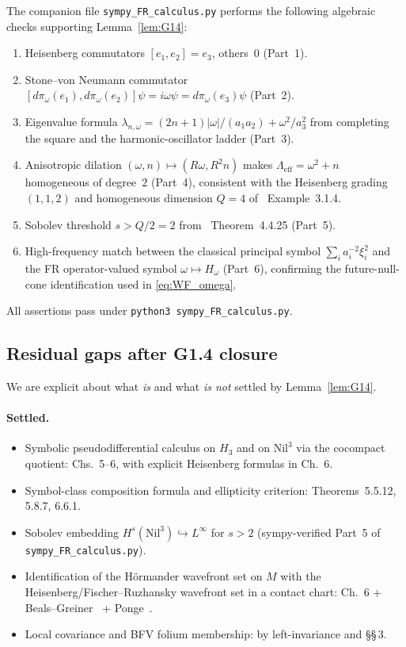 \documentclass[11pt, a4paper]{article}
\newcommand{\Hgroup}{H_3}
\newcommand{\Nil}{\mathrm{Nil}^3}
\newcommand{\dpiom}{d\pi_\omega}
\newcommand{\lam}{\lambda}
\newcommand{\om}{\omega}
\newcommand{\Lam}{\Lambda}
\begin{document}
The companion file \texttt{sympy\_FR\_calculus.py} performs the following
algebraic checks supporting Lemma~\ref{lem:G14}:
\begin{enumerate}[label=(\arabic*)]
  \item Heisenberg commutators $[e_1,e_2]=e_3$, others~$0$ (Part~1).
  \item Stone--von Neumann commutator
        $[\dpiom(e_1),\dpiom(e_2)]\psi = i\om\psi = \dpiom(e_3)\psi$ (Part~2).
  \item Eigenvalue formula $\lam_{n,\om}=(2n+1)|\om|/(a_1 a_2)+\om^2/a_3^2$
        from completing the square and the harmonic-oscillator ladder (Part~3).
  \item Anisotropic dilation $(\om,n)\mapsto(R\om,R^2 n)$ makes
        $\Lam_{\mathrm{eff}}=\om^2+n$ homogeneous of degree~$2$ (Part~4),
        consistent with the Heisenberg grading $(1,1,2)$ and homogeneous
        dimension $Q=4$ of \cite{FR16}~Example~3.1.4.
  \item Sobolev threshold $s>Q/2=2$ from \cite{FR16}~Theorem~4.4.25 (Part~5).
  \item High-frequency match between the classical principal symbol
        $\sum_i a_i^{-2}\xi_i^2$ and the FR operator-valued symbol
        $\om\mapsto H_\om$ (Part~6), confirming the future-null-cone
        identification used in \eqref{eq:WF_omega}.
\end{enumerate}
All assertions pass under \texttt{python3 sympy\_FR\_calculus.py}.

\subsection{Residual gaps after G1.4 closure}\label{sec:residual}

We are explicit about what \emph{is} and what \emph{is not} settled by
Lemma~\ref{lem:G14}.

\paragraph{Settled.}
\begin{itemize}[leftmargin=*,nosep]
  \item Symbolic pseudodifferential calculus on $\Hgroup$ and on $\Nil$ via
        the cocompact quotient: \cite{FR16} Chs.~5--6, with explicit
        Heisenberg formulas in Ch.~6.
  \item Symbol-class composition formula and ellipticity criterion:
        \cite{FR16} Theorems~5.5.12, 5.8.7, 6.6.1.
  \item Sobolev embedding $H^s(\Nil)\hookrightarrow L^\infty$ for $s>2$
        (sympy-verified Part~5 of \texttt{sympy\_FR\_calculus.py}).
  \item Identification of the Hörmander wavefront set on $M$ with the
        Heisenberg/Fischer--Ruzhansky wavefront set in a contact chart:
        \cite{FR16} Ch.~6 + Beals--Greiner~\cite{BG88} + Ponge~\cite{Pon08}.
  \item Local covariance and BFV folium membership: by left-invariance and
        \cite{BFV03} \S\S\,3.
\end{itemize}
\end{document}
